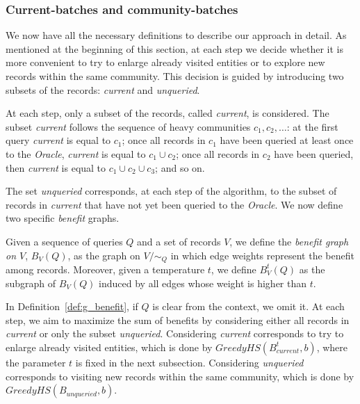 \documentclass[sigconf, nonacm]{acmart}
\newcommand{\oracle}{\textit{Oracle}\xspace}
\newcommand{\window}{b}
\begin{document}
\subsubsection{Current-batches and community-batches}\label{subsub:current_community_batches}

We now have all the necessary definitions to describe our approach in detail. As mentioned at the beginning of this section, at each step we decide whether it is more convenient to try to enlarge already visited entities or to explore new records within the same community. This decision is guided by introducing two subsets of the records: \emph{current} and \emph{unqueried}.

At each step, only a subset of the records, called \emph{current}, is considered. The subset \emph{current} follows the sequence of heavy communities $c_1, c_2,\ldots$: at the first query \emph{current} is equal to $c_1$; once all records in $c_1$ have been queried at least once to the \oracle, \emph{current} is equal to $c_1\cup c_2$; once all records in $c_2$ have been queried, then \emph{current} is equal to $c_1\cup c_2\cup c_3$; and so on.

The set \emph{unqueried} corresponds, at each step of the algorithm, to the subset of records in \emph{current} that have not yet been queried to the \oracle. We now define two specific \emph{benefit} graphs.

\begin{definition}\label{def:g_benefit}
    Given a sequence of queries $Q$ and a set of records $V$, we define the \emph{benefit graph on $V$}, $B_{V}(Q)$, as the graph on $V/\sim_Q$ in which edge weights represent the benefit among records. Moreover, given a temperature $t$, we define $B_{V}^t(Q)$ as the subgraph of $B_{V}(Q)$ induced by all edges whose weight is higher than $t$.
\end{definition}


In Definition~\ref{def:g_benefit}, if $Q$ is clear from the context, we omit it. At each step, we aim to maximize the sum of benefits by considering either all records in \emph{current} or only the subset \emph{unqueried}. Considering \emph{current} corresponds to try to enlarge already visited entities, which is done by $\textit{GreedyHS}(B^t_{\textit{current}},\window)$, where the parameter $t$ is fixed in the next subsection. Considering \emph{unqueried} corresponds to visiting new records within the same community, which is done by $\textit{GreedyHS}(B_{\textit{unqueried}},\window)$.
\end{document}
